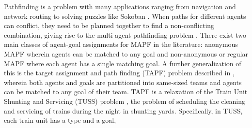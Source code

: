 \documentclass[a4paper,10pt,english]{article}
\begin{document}
	Pathfinding is a problem with many applications ranging from navigation and network routing to solving puzzles like Sokoban \cite{junghanns1999}. When paths for different agents can conflict, they need to be planned together to find a non-conflicting combination, giving rise to the multi-agent pathfinding problem \cite{stern2019}. There exist two main classes of agent-goal assignments for MAPF in the literature: anonymous MAPF \cite{yu2013} wherein agents can be matched to any goal and non-anonymous or regular MAPF where each agent has a single matching goal. A further generalization of this is the target assignment and path finding (TAPF) problem described in \cite{ma2016}, wherein both agents and goals are partitioned into same-sized teams and agents can be matched to any goal of their team. TAPF is a relaxation of the Train Unit Shunting and Servicing (TUSS) problem \cite{mulderij2020}, the problem of scheduling the cleaning and servicing of trains during the night in shunting yards. Specifically, in TUSS, each train unit has a type and a goal, 
	
	\newpage
	\printbibliography
\end{document}
